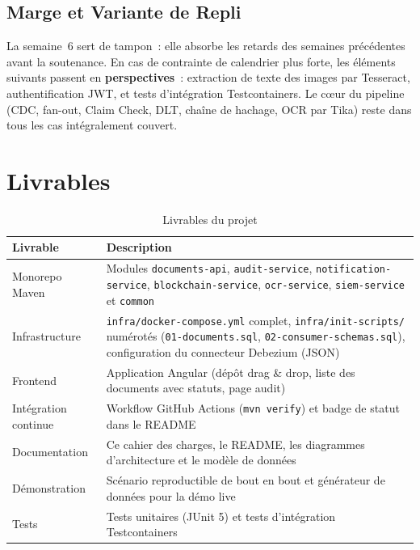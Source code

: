 \documentclass[12pt,a4paper,openany]{report}
\begin{document}
    \section{Marge et Variante de Repli}

    La semaine~6 sert de tampon~: elle absorbe les retards des semaines pr\'ec\'edentes avant la soutenance. En cas de contrainte de calendrier plus forte, les \'el\'ements suivants passent en \textbf{perspectives}~: extraction de texte des images par Tesseract, authentification JWT, et tests d'int\'egration Testcontainers. Le c\oe ur du pipeline (CDC, fan-out, Claim Check, DLT, cha\^ine de hachage, OCR par Tika) reste dans tous les cas int\'egralement couvert.

    \chapter{Livrables}

    \begin{table}[H]
    \centering
    \begin{tabularx}{\textwidth}{lX}
    \toprule
    \textbf{Livrable} & \textbf{Description} \\
    \midrule
    Monorepo Maven & Modules \texttt{documents-api}, \texttt{audit-service}, \texttt{notification-service}, \texttt{blockchain-service}, \texttt{ocr-service}, \texttt{siem-service} et \texttt{common} \\
    Infrastructure & \texttt{infra/docker-compose.yml} complet, \texttt{infra/init-scripts/} num\'erot\'es (\texttt{01-documents.sql}, \texttt{02-consumer-schemas.sql}), configuration du connecteur Debezium (JSON) \\
    Frontend & Application Angular (d\'ep\^ot drag \& drop, liste des documents avec statuts, page audit) \\
    Int\'egration continue & Workflow GitHub Actions (\texttt{mvn verify}) et badge de statut dans le README \\
    Documentation & Ce cahier des charges, le README, les diagrammes d'architecture et le mod\`ele de donn\'ees \\
    D\'emonstration & Sc\'enario reproductible de bout en bout et g\'en\'erateur de donn\'ees pour la d\'emo live \\
    Tests & Tests unitaires (JUnit 5) et tests d'int\'egration Testcontainers \\
    \bottomrule
    \end{tabularx}
    \caption{Livrables du projet}
    \end{table}
\end{document}
